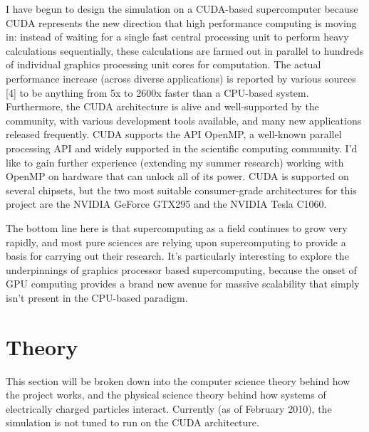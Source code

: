 \documentclass[10pt]{article}
\begin{document}
I have begun to design the simulation on a CUDA-based supercomputer because CUDA represents the new direction that high performance computing is moving in: instead of waiting for a single fast central processing unit to perform heavy calculations sequentially, these calculations are farmed out in parallel to hundreds of individual graphics processing unit cores for computation. The actual performance increase (across diverse applications) is reported by various sources [4] to be anything from 5x to 2600x faster than a CPU-based system. Furthermore, the CUDA architecture is alive and well-supported by the community, with various development tools available, and many new applications released frequently. CUDA supports the API OpenMP, a well-known parallel processing API and widely supported in the scientific computing community. I'd like to gain further experience (extending my summer research) working with OpenMP on hardware that can unlock all of its power. CUDA is supported on several chipsets, but the two most suitable consumer-grade architectures for this project are the NVIDIA GeForce GTX295 and the NVIDIA Tesla C1060. 

The bottom line here is that supercomputing as a field continues to grow very rapidly, and most pure sciences are relying upon supercomputing to provide a basis for carrying out their research. It's particularly interesting to explore the underpinnings of graphics processor based supercomputing, because the onset of GPU computing provides a brand new avenue for massive scalability that simply isn't present in the CPU-based paradigm.

\section{Theory}
This section will be broken down into the computer science theory behind how the project works, and the physical science theory behind how systems of electrically charged particles interact. Currently (as of February 2010), the simulation is not tuned to run on the CUDA architecture.
\end{document}
